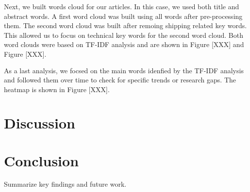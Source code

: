 \documentclass[a4paper, review, endfloat, authoryear]{elsarticle}
\begin{document}
	Next, we built words cloud for our articles. In this case, we used both title and abstract words. A first word cloud was built using all words after pre-processing them. The second word cloud was built after remoing shipping related key words. This allowed us to focus on technical key words for the second word cloud. Both word clouds were based on TF-IDF analysis and are shown in Figure [XXX] and Figure [XXX].
	
	As a last analysis, we focsed on the main words idenfied by the TF-IDF analysis and followed them over time to check for specific trends or research gaps. The heatmap is shown in Figure [XXX].
	
	\section{Discussion}
	
	\section{Conclusion}
	Summarize key findings and future work.
	
	
	
	
\end{document}
